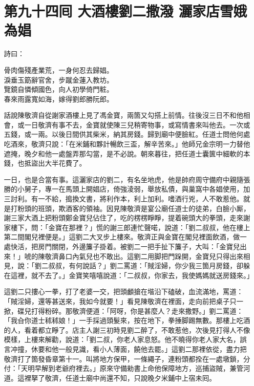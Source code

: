 
\chapter*{第九十四囘 大酒樓劉二撒潑 灑家店雪娥為娼}


詩曰：

\begin{myquote}
骨肉傷殘產業荒，一身何忍去歸娼。\\淚垂玉筯辭官舍，步蹴金蓮入教坊。\\覽鏡自憐傾國色，向人初學倚門粧。\\春來雨露寬如海，嫁得劉郎勝阮郎。
\end{myquote}

話說陳敬濟自從謝家酒樓上見了馮金寶，兩箇又勾搭上前情。往後沒三日不和他相會，或一日敬濟有事不去，金寶就使陳三兒稍寄物事，或寫情書來叫他去。一次或五錢，或一兩。以後日間供其柴米，納其房錢。歸到廟中便臉紅。任道士問他何處吃酒來，敬濟只說：「在米鋪和夥計暢飲三盃，解辛苦來。」他師兄金宗明一力替他遮掩，晚夕和他一處盤弄那勾當，是不必說。朝來暮往，把任道士囊篋中細軟的本錢，也抵盜出大半花費了。

一日，也是合當有事。這灑家店的劉二，有名坐地虎，他是帥府周守備府中親隨張勝的小舅子，專一在馬頭上開娼店，倚強淩弱，舉放私債，與巢窩中各娼使用，加三討利。有一不給，搗換文書，將利作本，利上加利。嗜酒行兇，人不敢惹他。就是打粉頭的班頭，欺酒客的領袖。因見陳敬濟是宴公廟任道士的徒弟，白臉小厮，謝三家大酒上把粉頭鄭金寶兒佔住了，吃的楞楞睜睜，提着碗頭大的拳頭，{}走來謝家樓下，問：「金寶在那裡？」慌的謝三郎連忙聲喏，說道：「劉二叔叔，他在樓上第二間閣兒裡便是。」這劉二大叉步上樓來。敬濟正與金寶在閣兒裡面飲酒，做一處快活，把房門關閉，外邊簾子掛着。被劉二一把手扯下簾子，大叫：「金寶兒出來！」唬的陳敬濟鼻口內氣兒也不敢出。這劉二用脚把門跺開，金寶兒只得出來相見，說：「劉二叔叔，有何說話？」劉二罵道：「賊淫婦，你少我三箇月房錢，卻躲在這裡，就不去了。」金寶笑嘻嘻說道：「二叔叔，你家去，我使媽媽就送房錢來。」

這劉二只摟心一拳，打了老婆一交，把頭顱搶在堦沿下磕破，血流滿地，罵道：「賊淫婦，還等甚送來，我如今就要！」看見陳敬濟在裡面，走向前把桌子只一掀，碟兒打得粉碎。那敬濟便道：「阿呀，你是甚麼人？走來撒野。」劉二罵道：「我㒲你道士秫秫娘！」一手採過頭髮來，按在地下，拳捶脚踢無數。那樓上吃酒的人，看着都立睜了。店主人謝三初時見劉二醉了，不敢惹他，次後見打得人不像模樣，上樓來解勸，說道：「劉二叔，你老人家息怒。他不曉得你老人家大名，誤言冲撞，休要和他一般見識，看小人薄面，饒他去罷。」這劉二那裡依從，盡力把敬濟打了箇發昏章第十一。叫將地方保甲，一條繩子，連粉頭都拴在一處墩鎖，分付：「天明早解到老爺府裡去。」原來守備勑書上命他保障地方，巡捕盜賊，兼管河道。這裡拏了敬濟，任道士廟中尚還不知，只說晚夕米鋪中上宿未囘。

